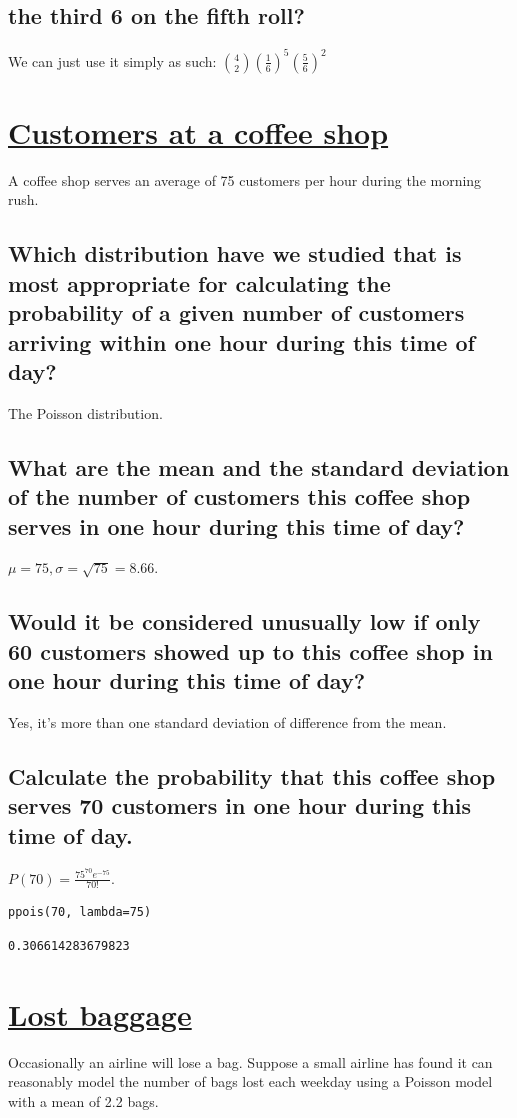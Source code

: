 \documentclass[11pt]{article}
\begin{document}
\subsection{the third 6 on the fifth roll?}
\label{sec:orgfd6f660}
We can just use it simply as such: \(\binom{4}{2}(\frac{1}{6})^{5}(\frac{5}{6})^{2}\)
\section{\underline{Customers at a coffee shop}}
\label{sec:orgbc70ab2}
A coffee shop serves an average of 75 customers per hour during the morning rush.
\subsection{Which distribution have we studied that is most appropriate for calculating the probability of a given number of customers arriving within one hour during this time of day?}
\label{sec:org10460ca}
The Poisson distribution.
\subsection{What are the mean and the standard deviation of the number of customers this coffee shop serves in one hour during this time of day?}
\label{sec:org25f3e32}
\(\mu = 75, \sigma = \sqrt{75} = 8.66\).
\subsection{Would it be considered unusually low if only 60 customers showed up to this coffee shop in one hour during this time of day?}
\label{sec:orgd227866}
Yes, it's more than one standard deviation of difference from the mean.
\subsection{Calculate the probability that this coffee shop serves 70 customers in one hour during this time of day.}
\label{sec:org7ebb9cc}
\(P(70) = \frac{75^{70}e^{-75}}{70!}\).

\begin{verbatim}
ppois(70, lambda=75)
\end{verbatim}

\begin{verbatim}
0.306614283679823
\end{verbatim}

\section{\underline{Lost baggage}}
\label{sec:org11e1a99}
Occasionally an airline will lose a bag. Suppose a small airline has found it can reasonably model the number of bags lost each weekday using a Poisson model with a mean of 2.2 bags.  
\end{document}

